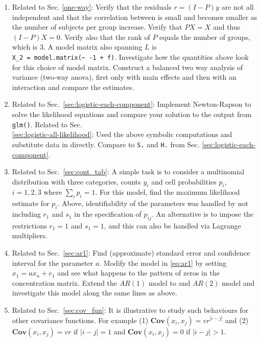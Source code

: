 \documentclass[10pt,]{article}
\begin{document}
\begin{enumerate}
\def\labelenumi{\arabic{enumi}.}
\item
  Related to Sec. \ref{one-way}: Verify that the residuals \(r=(I-P)y\)
  are not all independent and that the correlation between is small and
  becomes smaller as the number of subjects per group increase. Verify
  that \(P X = X\) and thus \((I - P)X = 0\). Verify also that the rank
  of \(P\) equals the number of groups, which is 3. A model matrix also
  spanning \(L\) is
  \texttt{X\_2\ =\ model.matrix(\textasciitilde{}\ -1\ +\ f)}.
  Investigate how the quantities above look for this choice of model
  matrix. Construct a balanced two way analysis of variance (two-way
  anova), first only with main effects and then with an interaction and
  compare the estimates.
\item
  Related to Sec.~\ref{sec:logistic-each-component}: Implement
  Newton-Rapson to solve the likelihood equations and compare your
  solution to the output from \texttt{glm()}. Related to Sec.\\
  \ref{sec:logistic-all-likelihood}: Used the above symbolic
  computations and substitute data in directly. Compare to \texttt{S.}
  and \texttt{H.} from Sec. \ref{sec:logistic-each-component}.
\item
  Related to Sec.~\ref{sec:cont_tab}: A simple task is to consider a
  multinomial distribution with three categories, counts \(y_i\) and
  cell probabilities \(p_i\), \(i=1,2,3\) where \(\sum_i p_i=1\). For
  this model, find the maximum likelihood estimate for \(p_i\). Above,
  identifiability of the parameters was handled by not including \(r_1\)
  and \(s_1\) in the specification of \(p_{ij}\). An alternative is to
  impose the restrictions \(r_1=1\) and \(s_1=1\), and this can also be
  handled via Lagrange multipliers.
\item
  Related to Sec.~\ref{sec:ar1}: Find (approximate) standard error and
  confidence interval for the parameter \(a\). Modify the model in
  \eqref{eq:ar1} by setting \(x_1 = a x_n + e_1\) and see what happens
  to the pattern of zeros in the concentration matrix. Extend the
  \(AR(1)\) model to and \(AR(2)\) model and investigate this model
  along the same lines as above.
\item
  Related to Sec.~\ref{sec:cov_fun}: It is illustrative to study such
  behaviours for other covariance functions. For example (1)
  \(\mathbf{Cov}(x_i, x_j)=v r^{|i-j|}\) and (2)
  \(\mathbf{Cov}(x_i, x_j)=v r\) if \(|i-j| = 1\) and
  \(\mathbf{Cov}(x_i, x_j)=0\) if \(|i-j| > 1\).
\end{enumerate}
\end{document}
